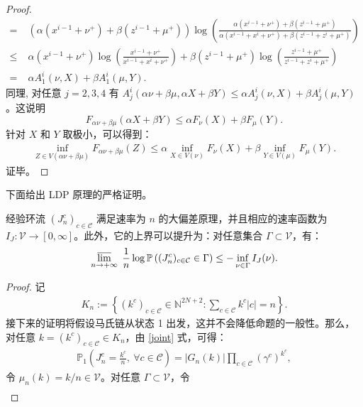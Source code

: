\begin{appendices}
\begin{proof}
\begin{align*}
		=&\;(\alpha (x^{i-1}+\nu^+)+\beta (z^{i-1}+ \mu^+) )\log\left(\frac{\alpha (x^{i-1}+\nu^+)+\beta (z^{i-1}+ \mu^+)}{\alpha (x^{i-1}+ x^i+\nu^+)+\beta (z^{i-1}+ z^i+ \mu^+)}\right)\\
		\le &\; \alpha (x^{i-1}+\nu^+)\log\left(\frac{x^{i-1}+\nu^+}{x^{i-1}+ x^i+\nu^+}\right)+\beta (z^{i-1}+ \mu^+)\log\left(\frac{z^{i-1}+ \mu^+}{z^{i-1}+ z^i+ \mu^+}\right)\\
		=&\;\alpha A^i_1(\nu,X)+\beta A^i_1(\mu,Y).
	\end{align*}
	同理, 对任意 $j=2,3,4$ 有 $A^i_j(\alpha \nu+\beta \mu,\alpha X+\beta Y)\le \alpha A^i_j(\nu,X)+\beta A^i_j (\mu,Y)$。这说明
	\begin{equation*}
		F_{\alpha \nu+\beta \mu}(\alpha X+\beta Y)\le \alpha F_{\nu}(X)+\beta F_{\mu}(Y).
	\end{equation*}
	针对 $X$ 和 $Y$ 取极小，可以得到：
	\begin{align*}
		\inf_{Z\in V(\alpha\nu+\beta\mu)}F_{\alpha\nu+\beta\mu}( Z)\le\alpha \inf_{X\in V(\nu)} F_{\nu}(X)+\beta \inf_{Y\in V(\mu)} F_{\mu}(Y).
	\end{align*}
	证毕。
\end{proof}
下面给出 LDP 原理的严格证明。
\begin{proposition}\label{theorem:LDP}
	经验环流 $(J^c_n)_{c\in\mathcal{C}}$ 满足速率为 $n$ 的大偏差原理，并且相应的速率函数为 $I_J:\mathcal{V}\to [0,\infty]$。此外，它的上界可以提升为：对任意集合 $\Gamma \subset \mathcal{V}$，有：
	\begin{align}\label{upper bound}
		\varlimsup_{n\to+\infty}\;
		\frac 1n \log \mathbb  P \left( (J^c_n)_{c\in \mathcal{C}} \in \Gamma \right)
		\le -\inf_{\nu\in \Gamma} I_J(\nu).
	\end{align}
\end{proposition}
\begin{proof}
记
\begin{align}\label{set:K_n}
K_n := \left\{(k^c)_{c\in \mathcal{C}}\in \mathbb{N}^{2N+2}: \sum_{c \in \mathcal{C}} k^{c} |c| =n \right\}.
\end{align}
接下来的证明将假设马氏链从状态 1 出发，这并不会降低命题的一般性。那么，对任意 $k=(k^c)_{c\in\mathcal{C}}\in K_n$，由 \eqref{joint} 式，可得：
\begin{align}\label{Jnxi}
\mathbb{P}_1\left(J^c_{n}= \frac{k^c}{n},\ \forall c\in \mathcal{C}\right)
= |G_n(k)| \prod_{c\in\mathcal{C}}\left(\gamma^c\right)^{k^c},
\end{align}
令 $\mu_n(k) = k/n\in\mathcal{V}$。对任意 $\Gamma\subset \mathcal{V}$，令
\begin{align*}

\end{align*}
\end{proof}
\end{appendices}
